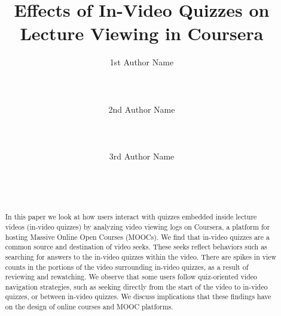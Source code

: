 \documentclass{sigchi}
\begin{document}
\title{Effects of In-Video Quizzes on Lecture Viewing in Coursera}

\author{
  \alignauthor 1st Author Name\\
    \\
    \\
    \\
  \alignauthor 2nd Author Name\\
    \\
    \\
    \\
  \alignauthor 3rd Author Name\\
    \\
    \\
    \\
}

\maketitle

\begin{abstract}
In this paper we look at how users interact with quizzes embedded inside lecture videos (in-video quizzes) by analyzing video viewing logs on Coursera, a platform for hosting Massive Online Open Courses (MOOCs). We find that in-video quizzes are a common source and destination of video seeks. These seeks reflect behaviors such as searching for answers to the in-video quizzes within the video. There are spikes in view counts in the portions of the video surrounding in-video quizzes, as a result of reviewing and rewatching. We observe that some users follow quiz-oriented video navigation strategies, such as seeking directly from the start of the video to in-video quizzes, or between in-video quizzes. We discuss implications that these findings have on the design of online courses and MOOC platforms. %
\end{abstract}
\end{document}
